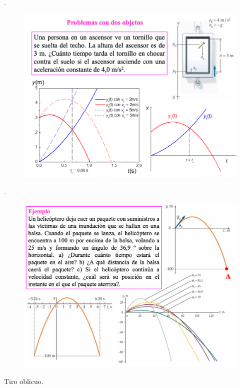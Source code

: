 \begin{prob}.
	\begin{figure}[H]
		\centering
		\includegraphics[width=.9\textwidth]{imagenes/imagenes02/T02IM26.png}
		\end{figure}
\end{prob}

\begin{prob}.
	\begin{figure}[H]
		\centering
		\includegraphics[width=.85\textwidth]{imagenes/imagenes02/T02IM27.png}
		\end{figure}
\end{prob}



\begin{prob} Tiro oblicuo.
\end{prob}	

